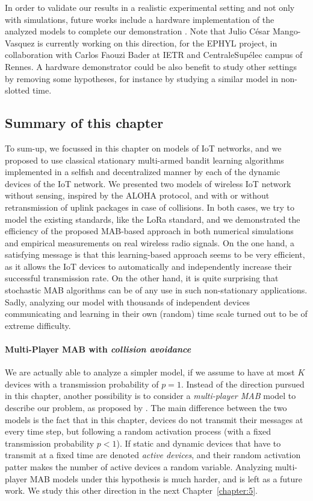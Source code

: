 In order to validate our results in a realistic experimental setting and not only with simulations, future works include a hardware implementation of the analyzed models to complete our demonstration \cite{Besson2019WCNC}.
Note that Julio César Mango-Vasquez is currently working on this direction, for the EPHYL project, in collaboration with Carlos Faouzi Bader at IETR and CentraleSupélec campus of Rennes.
%
A hardware demonstrator could be also benefit to study other settings by removing some hypotheses, for instance by studying a similar model in non-slotted time.


\subsection*{Summary of this chapter}

To sum-up, we focussed in this chapter on models of IoT networks, and we proposed to use classical stationary multi-armed bandit learning algorithms implemented in a selfish and decentralized manner by each of the dynamic devices of the IoT network.
We presented two models of wireless IoT network without sensing, inspired by the ALOHA protocol, and with or without retransmission of uplink packages in case of collisions.
In both cases, we try to model the existing standards, like the LoRa standard, and we demonstrated the efficiency of the proposed MAB-based approach in both numerical simulations and empirical measurements on real wireless radio signals.
%
On the one hand, a satisfying message is that this learning-based approach seems to be very efficient, as it allows the IoT devices to automatically and independently increase their successful transmission rate.
On the other hand, it is quite surprising that stochastic MAB algorithms can be of any use in such non-stationary applications.
Sadly, analyzing our model with thousands of independent devices communicating and learning in their own (random) time scale turned out to be of extreme difficulty.



\paragraph{Multi-Player MAB with \emph{collision avoidance}}

We are actually able to analyze a simpler model, if we assume to have at most $K$ devices with a transmission probability of $p=1$.
Instead of the direction pursued in this chapter, another possibility is to consider a \emph{multi-player MAB} model to describe our problem, as proposed by \cite{Zhao10}.
%
The main difference between the two models is the fact that in this chapter, devices do not transmit their messages at every time step, but following a random activation process (with a fixed transmission probability $p < 1$).
If static and dynamic devices that have to transmit at a fixed time are denoted \emph{active devices},
and their random activation patter makes the number of active devices a random variable.
Analyzing multi-player MAB models under this hypothesis is much harder, and is left as a future work.
%
We study this other direction in the next Chapter~\ref{chapter:5}.

